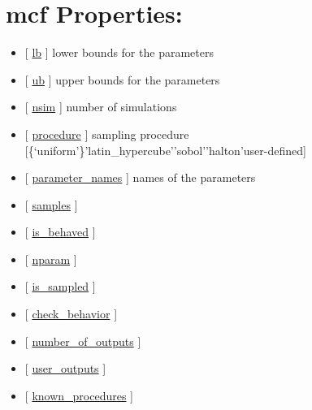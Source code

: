 \documentclass[letterpaper,10pt,english]{sphinxmanual}
\begin{document}
\section{mcf Properties:}
\label{classes/utils/@mcf/mcf:mcf-properties}\begin{itemize}
\item {} 
{[} {\hyperref[classes/utils/@mcf/mcf:lb]{lb}} {]}   lower bounds for the parameters

\item {} 
{[} {\hyperref[classes/utils/@mcf/mcf:ub]{ub}} {]}   upper bounds for the parameters

\item {} 
{[} {\hyperref[classes/utils/@mcf/mcf:nsim]{nsim}} {]}   number of simulations

\item {} 
{[} {\hyperref[classes/utils/@mcf/mcf:procedure]{procedure}} {]}   sampling procedure {[}\{`uniform'\}\textbar{}'latin\_hypercube'\textbar{}'sobol'\textbar{}'halton'{\color{red}\bfseries{}\textbar{}}user-defined{]}

\item {} 
{[} {\hyperref[classes/utils/@mcf/mcf:parameter-names]{parameter\_names}} {]}   names of the parameters

\item {} 
{[} {\hyperref[classes/utils/@mcf/mcf:samples]{samples}} {]}

\item {} 
{[} {\hyperref[classes/utils/@mcf/mcf:is-behaved]{is\_behaved}} {]}

\item {} 
{[} {\hyperref[classes/utils/@mcf/mcf:nparam]{nparam}} {]}

\item {} 
{[} {\hyperref[classes/utils/@mcf/mcf:is-sampled]{is\_sampled}} {]}

\item {} 
{[} {\hyperref[classes/utils/@mcf/mcf:check-behavior]{check\_behavior}} {]}

\item {} 
{[} {\hyperref[classes/utils/@mcf/mcf:number-of-outputs]{number\_of\_outputs}} {]}

\item {} 
{[} {\hyperref[classes/utils/@mcf/mcf:user-outputs]{user\_outputs}} {]}

\item {} 
{[} {\hyperref[classes/utils/@mcf/mcf:known-procedures]{known\_procedures}} {]}

\end{itemize}
\end{document}
